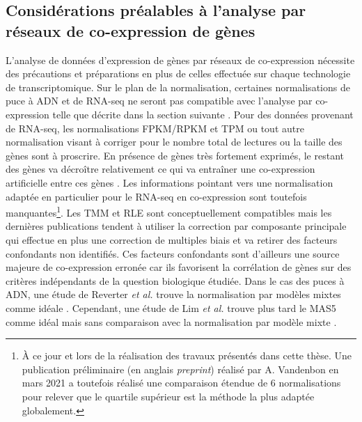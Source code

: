 \subsection{Considérations préalables à l'analyse par réseaux de co-expression de gènes}

L'analyse de données d'expression de gènes par réseaux de co-expression nécessite des précautions et préparations en plus de celles effectuée sur chaque technologie de transcriptomique. Sur le plan de la normalisation, certaines normalisations de puce à ADN et de RNA-seq ne seront pas compatible avec l'analyse par co-expression telle que décrite dans la section suivante \cite{Zhang2005a}. Pour des données provenant de RNA-seq, les normalisations FPKM/RPKM et TPM ou tout autre normalisation visant à corriger pour le nombre total de lectures ou la taille des gènes sont à proscrire. En présence de gènes très fortement exprimés, le restant des gènes va décroître relativement ce qui va entraîner une co-expression artificielle entre ces gènes \cite{Spiko2017thesis}. Les informations pointant vers une normalisation adaptée en particulier pour le RNA-seq en co-expression sont toutefois manquantes\footnote{À ce jour et lors de la réalisation des travaux présentés dans cette thèse. Une publication préliminaire (en anglais \textit{preprint}) réalisé par A. Vandenbon en mars 2021 \cite{Vandenbon2021Mar} a toutefois réalisé une comparaison étendue de 6 normalisations pour relever que le quartile supérieur est la méthode la plus adaptée globalement.}. Les TMM et RLE sont conceptuellement compatibles mais les dernières publications tendent à utiliser la correction par composante principale \cite{Parsana2019} qui effectue en plus une correction de multiples biais et va retirer des facteurs confondants non identifiés. Ces facteurs confondants sont d'ailleurs une source majeure de co-expression erronée car ils favorisent la corrélation de gènes sur des critères indépendants de la question biologique étudiée. Dans le cas des puces à ADN, une étude de Reverter \textit{et al.} trouve la normalisation par modèles mixtes comme idéale \cite{Reverter2005Apr}. Cependant, une étude de Lim \textit{et al.} trouve plus tard le MAS5 comme idéal mais sans comparaison avec la normalisation par modèle mixte \cite{Lim2007Jul}.

